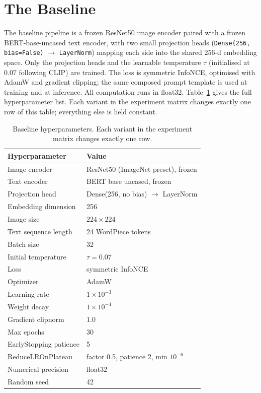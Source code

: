 \section{The Baseline}
\label{sec:meth-baseline}

The baseline pipeline is a frozen ResNet50 image encoder paired with a frozen BERT-base-uncased text encoder, with two small projection heads (\texttt{Dense(256, bias=False)} $\rightarrow$ \texttt{LayerNorm}) mapping each side into the shared $256$-d embedding space. Only the projection heads and the learnable temperature $\tau$ (initialised at $0.07$ following CLIP) are trained. The loss is symmetric InfoNCE, optimised with AdamW and gradient clipping; the same composed prompt template is used at training and at inference. All computation runs in float32. Table~\ref{tab:baseline-hyperparameters} gives the full hyperparameter list. Each variant in the experiment matrix changes exactly one row of this table; everything else is held constant.

\begin{table}[H]
    \centering
    \begin{tabular}{|l|l|}
    \hline
    \textbf{Hyperparameter} & \textbf{Value} \\ \hline
    Image encoder              & ResNet50 (ImageNet preset), frozen \\ \hline
    Text encoder               & BERT base uncased, frozen \\ \hline
    Projection head            & Dense(256, no bias) $\to$ LayerNorm \\ \hline
    Embedding dimension        & 256 \\ \hline
    Image size                 & $224 \times 224$ \\ \hline
    Text sequence length       & 24 WordPiece tokens \\ \hline
    Batch size                 & 32 \\ \hline
    Initial temperature        & $\tau = 0.07$ \\ \hline
    Loss                       & symmetric InfoNCE \\ \hline
    Optimizer                  & AdamW \\ \hline
    Learning rate              & $1 \times 10^{-3}$ \\ \hline
    Weight decay               & $1 \times 10^{-4}$ \\ \hline
    Gradient clipnorm          & 1.0 \\ \hline
    Max epochs                 & 30 \\ \hline
    EarlyStopping patience     & 5 \\ \hline
    ReduceLROnPlateau          & factor 0.5, patience 2, min $10^{-6}$ \\ \hline
    Numerical precision        & float32 \\ \hline
    Random seed                & 42 \\ \hline
    \end{tabular}
    \caption{Baseline hyperparameters. Each variant in the experiment matrix changes exactly one row.}
    \label{tab:baseline-hyperparameters}
\end{table}

